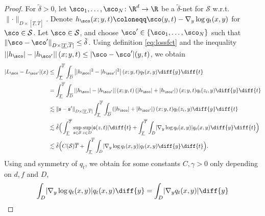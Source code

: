 \documentclass[a4paper, 11pt, headings = small, abstract]{scrartcl}
\begin{document}
\begin{proof} 
For $\tilde \delta>0$, let $\sco_1,\ldots,\sco_N\colon \R^d\to\R$ be a $\tilde \delta$-net for $\mathcal{S}$ w.r.t.\ $\lVert  \cdot  \rVert_{D \times [\underline{T},\overline{T}]}$.
Denote $h_{\sco}(x;y,t)\coloneqq \sco(y,t)- \nabla_y \log q_t(x,y)$ for $\sco \in \mathcal{S}$.   Let $\sco \in \mathcal{S}$, and choose $\sco^\prime \in \{\sco_1,\ldots,\sco_N\}$ such that $\lVert  \sco - \sco^\prime  \rVert_{D \times [\underline{T},\overline{T}]} \leq \tilde{\delta}$.
Using definition \eqref{eq:lossfct} and the inequality  $\left\lvert\lvert h_\sco \rvert - \lvert h_{\sco'} \rvert \right\rvert(x;y,t) \leq \lvert \sco-\sco'\rvert(y,t) $, we obtain
\begin{equation}\label{eq:bound_cover}
\begin{split}
		\lvert L_{\sco} - L_{\sco^\prime} \rvert(x)
		&\leq \int_{ \underline{T}}^{\overline{T}}\int_{\overline D}\left\lvert\lvert h_\sco \rvert^2-\lvert h_{\sco'}\rvert^2\right\rvert(x;y,t)q_t(x,y)\diff{y}\diff{t}\\
		&= \int_{ \underline{T}}^{\overline{T}}\int_{\overline D}\left\lvert\lvert h_\sco \rvert -\lvert h_{\sco'} \rvert\right\rvert(x;y,t)\left(\lvert h_\sco \rvert + \lvert h_{\sco'} \rvert\right)(x;y,t)q_t(z_i,y)\diff{y}\diff{t}\\
    	&\lesssim \lVert  \mathfrak{s} - \mathfrak{s}^\prime  \rVert_{D \times [\underline{T},\overline{T}]} \int_{ \underline{T}}^{\overline{T}}\int_{\overline D}\left(\lvert h_\sco \rvert + \lvert h_{\sco'}\rvert\right)(x;y,t)q_t(z_i,y)\diff{y}\diff{t}\\
    	&\lesssim \tilde{\delta} \Big(\int_{\underline{T}}^{\overline{T}} \sup_{\mathfrak{s} \in \mathcal{S}}\sup_{z \in D} \lvert \mathfrak{s}(z,t) \rvert \diff{t} + \int_{\underline{T}}^{\overline{T}} \int_D \lvert \nabla_y \log q_t(x,y) \rvert q_t(x,y) \diff{y} \diff{t} \Big) \\
&\lesssim \tilde{\delta}\Big(C(\mathcal{S})\overline{T} + \int_{\underline{T}}^{\overline{T}} \int_D \lvert \nabla_y \log q_t(x,y) \rvert q_t(x,y) \diff{y} \diff{t} \Big).
\end{split}
\end{equation}
Using \cite[Theorem 6.19]{ouh05} 
and symmetry of $q_t$, we obtain for some constants $C,\gamma > 0$ only depending on $d,f$ and $D$,
\begin{equation}\label{eq:log_grad}
\begin{split}
\int_D  \lvert \nabla_y \log q_t(x,y) \rvert q_t(x,y) \diff{y} &= \int_D \lvert \nabla_y q_t(x,y) \rvert \diff{y} \\ 

\end{split}
\end{equation}
\end{proof}
\end{document}
